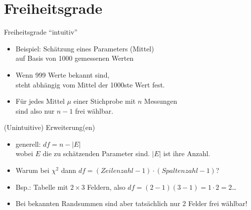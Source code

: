 \section{Freiheitsgrade}

\begin{frame}
  {Freiheitsgrade "`intuitiv"'}
  \begin{itemize}[<+->]
    \item Beispiel: Schätzung eines Parameters (\zB Mittel)\\
      auf Basis von 1000 gemessenen Werten
    \item Wenn 999 Werte bekannt sind,\\
      steht abhängig vom Mittel der 1000ste Wert fest.
      \Zeile
    \item Für jedes Mittel $\mu$ einer Stichprobe mit $n$ Messungen\\
      sind also nur $n-1$ frei wählbar.
  \end{itemize}
\end{frame}

\begin{frame}
  {(Unintuitive) Erweiterung(en)}
  \begin{itemize}[<+->]
    \item generell: \alert{$df=n-|E|$}\\
      wobei $E$ die zu schätzenden Parameter sind. $|E|$ ist ihre Anzahl.
    \item Warum bei \alert{$\chi^2$} dann \alert{$df=(Zeilenzahl-1)\cdot(Spaltenzahl-1)$}?
      \Zeile
    \item Bsp.: Tabelle mit $2\times3$ Feldern, also $df=(2-1)(3-1)=1\cdot2=2$\ldots
    \item Bei bekannten Randsummen sind aber tatsächlich nur 2 Felder frei wählbar!
  \end{itemize}
  \begin{center}
  \end{center}
\end{frame}



